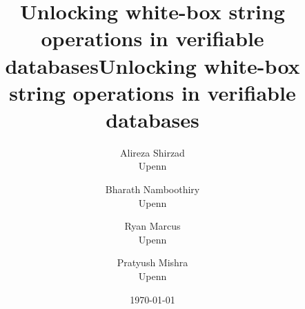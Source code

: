 








\ifsp
  \title{Unlocking white-box string operations in verifiable databases}
  \author{%
  }
\else
  \title{Unlocking white-box string operations in verifiable databases}
  \author{
    Alireza Shirzad\\
    Upenn
    \and
    Bharath Namboothiry\\
    Upenn
    \and
    Ryan Marcus\\
    Upenn
    \and
    Pratyush Mishra\\
    Upenn
  }
  \date{\today}
\fi


\maketitle


\ifsp\appendices\else\appendix\fi
% 





\doclearpage
\printbibliography


